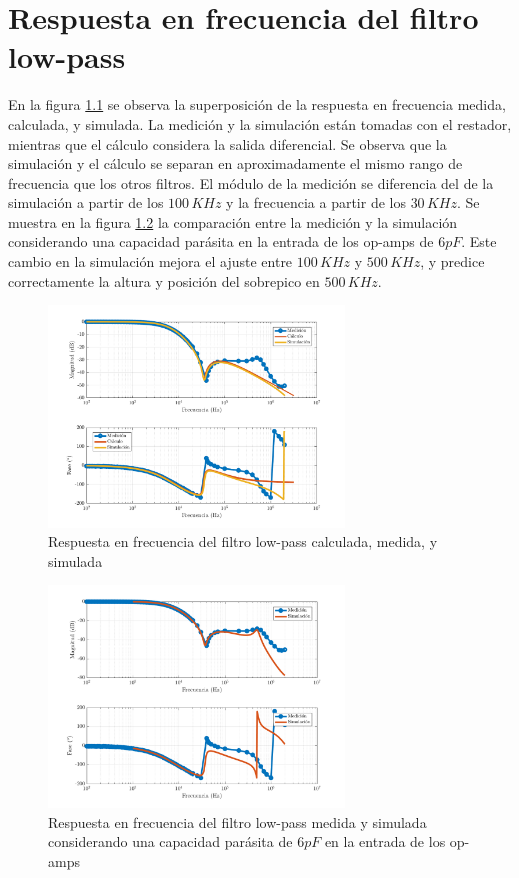 \documentclass[tc_tp3_anexo_main.tex]{subfiles}
\begin{document}
\chapter{Respuesta en frecuencia del filtro low-pass}

En la figura \ref{fig:ej2_LP_bode} se observa la superposici\'on de la respuesta en frecuencia medida, calculada, y simulada. La medici\'on y la simulaci\'on est\'an tomadas con el restador, mientras que el c\'alculo considera la salida diferencial. Se observa que la simulaci\'on y el c\'alculo se separan en aproximadamente el mismo rango de frecuencia que los otros filtros. El m\'odulo de la medici\'on se diferencia del de la simulaci\'on a partir de los $100\, KHz$ y la frecuencia a partir de los $30\, KHz$. Se muestra en la figura \ref{fig:ej2_LP_bode_con_caps} la comparaci\'on entre la medici\'on y la simulaci\'on considerando una capacidad par\'asita en la entrada de los op-amps de $6pF$. Este cambio en la simulaci\'on mejora el ajuste entre $100\, KHz$ y $500\, KHz$, y predice correctamente la altura y posici\'on del sobrepico en $500\, KHz$.

\begin{figure}[bp]
\centering
\includegraphics[width=0.7\textwidth]{imagenes/LP_bode.png}

\caption{Respuesta en frecuencia del filtro low-pass calculada, medida, y simulada}
\label{fig:ej2_LP_bode}
\end{figure}


\begin{figure}[bp]
\centering
\includegraphics[width=0.7\textwidth]{imagenes/LP_bode_cap.png}

\caption{Respuesta en frecuencia del filtro low-pass medida y simulada considerando una capacidad par\'asita de $6pF$ en la entrada de los op-amps}
\label{fig:ej2_LP_bode_con_caps}
\end{figure}
\end{document}
